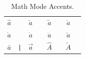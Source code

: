 
%
%
%
\newcommand{\X}[1]{$#1$&\texttt{\string#1}\hspace*{1ex}}
\newcommand{\SC}[1]{#1&\texttt{\string#1}\hspace*{1ex}}
\newcommand{\A}[1]{#1&\texttt{\string#1}\hspace*{1ex}}
\newcommand{\B}[2]{#1#2&\texttt{\string#1{} #2}\hspace*{1ex}}

\newcommand{\W}[2]{$#1{#2}$&
  \texttt{\string#1}\texttt{\string{\string#2\string}}\hspace*{1ex}}
\newcommand{\Y}[1]{$\big#1$ &\texttt{\string#1}}  %
\newcommand{\Z}[1]{\texttt{\string#1}}  %
\newsavebox{\symbbox}
\newenvironment{symbols}[1]%
{\par\vspace*{2ex}
\renewcommand{\arraystretch}{1.1}
\begin{lrbox}{\symbbox}
\hspace*{4ex}\begin{tabular}{@{}#1@{}}}%
{\end{tabular}\end{lrbox}\makebox[\textwidth]{\usebox{\symbbox}}\par\medskip}


\begin{table}[!h]
\caption{Math Mode Accents.}  \label{mathacc}
\begin{symbols}{*4{cl}}
\W{\hat}{a}     & \W{\check}{a} & \W{\tilde}{a} & \W{\acute}{a} \\
\W{\grave}{a} & \W{\dot}{a} & \W{\ddot}{a}    & \W{\breve}{a} \\
\W{\bar}{a} &\W{\vec}{a} &\W{\widehat}{A}&\W{\widetilde}{A}\\  
\end{symbols}
\end{table}
 
